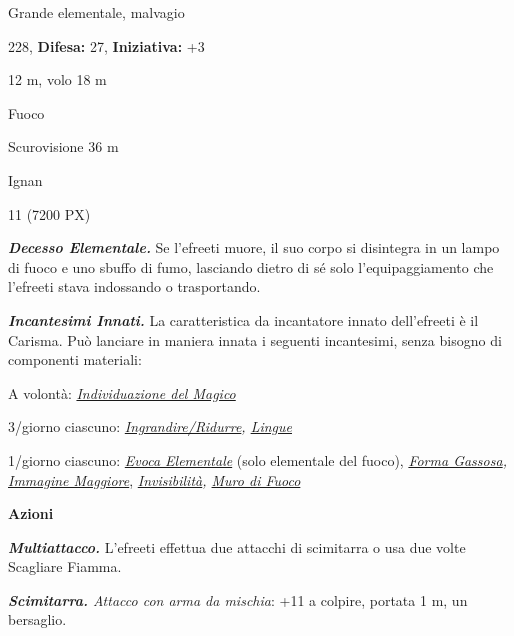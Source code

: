 \begin{multicols}{2}
{
\noindent
\begin{description}[noitemsep, topsep=0pt, parsep=0pt, partopsep=0pt, leftmargin=0cm, labelwidth=2.2cm]
	\item[\textbf{Taglia/Tipo:}] Grande elementale, malvagio
	\item[\textbf{Caratt.:}] 
	\item[\textbf{Punti Ferita:}] 228,  \textbf{Difesa:} 27,  \textbf{Iniziativa:} +3
	\item[\textbf{Movimento:}] 12 m, volo 18 m
	\item[\textbf{Tiri Salvez.:}] 
	\item[\textbf{Imm. Danni:}] Fuoco
	\item[\textbf{Sensi:}] Scurovisione 36 m
	\item[\textbf{Linguaggi:}] Ignan
	\item[\textbf{Sfida:}] 11 (7200 PX)\smallskip
\end{description}

\emph{\textbf{Decesso Elementale.}} Se l'efreeti muore, il suo corpo si disintegra in un lampo di fuoco e uno sbuffo di fumo, lasciando dietro di sé solo l'equipaggiamento che l'efreeti stava indossando o trasportando.

\emph{\textbf{Incantesimi Innati.}} La caratteristica da incantatore innato dell'efreeti è il Carisma. Può lanciare in maniera innata i seguenti incantesimi, senza bisogno di componenti materiali:

A volontà: \emph{\hyperlink{Individuazione del Magico}{Individuazione del Magico}}

3/giorno ciascuno: \emph{\hyperlink{Ingrandire/Ridurre}{Ingrandire/Ridurre}, \hyperlink{Lingue}{Lingue}}

1/giorno ciascuno: \emph{\hyperlink{Evoca Elementale}{Evoca Elementale}} (solo elementale del fuoco), \emph{\hyperlink{Forma Gassosa}{Forma Gassosa}, \hyperlink{Immagine Maggiore}{Immagine Maggiore}}, \emph{\hyperlink{Invisibilità}{Invisibilità}, \hyperlink{Muro di Fuoco}{Muro di Fuoco}}

\textbf{Azioni}

\emph{\textbf{Multiattacco.}} L'efreeti effettua due attacchi di scimitarra o usa due volte Scagliare Fiamma.

\emph{\textbf{Scimitarra.} Attacco con arma da mischia}: +11 a colpire, portata 1 m, un bersaglio.

}
\end{multicols}
